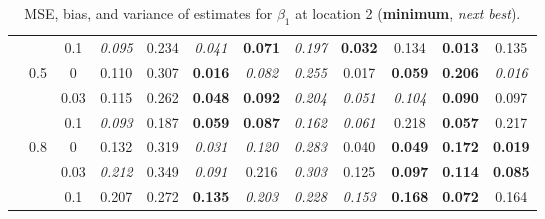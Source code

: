 \documentclass[authoryear, review, 11pt]{elsarticle}
\begin{document}
\begin{table}[ht]
\begin{center}
\begin{tabular}{ccc | ccc | ccc | ccc }
 &  & 0.1 &   \emph{0.095} & 0.234 & \emph{0.041} & \textbf{0.071} & \emph{0.197} & \textbf{0.032} & 0.134 & \textbf{0.013} & 0.135 \\ \cline{2-12}
 & \multirow{3}{*}{0.5} & 0 &   0.110 & 0.307 & \textbf{0.016} & \emph{0.082} & \emph{0.255} & 0.017 & \textbf{0.059} & \textbf{0.206} & \emph{0.016} \\ 
 &  & 0.03 &   0.115 & 0.262 & \textbf{0.048} & \textbf{0.092} & \emph{0.204} & \emph{0.051} & \emph{0.104} & \textbf{0.090} & 0.097 \\ 
 &  & 0.1 &   \emph{0.093} & 0.187 & \textbf{0.059} & \textbf{0.087} & \emph{0.162} & \emph{0.061} & 0.218 & \textbf{0.057} & 0.217 \\ \cline{2-12}
 & \multirow{3}{*}{0.8} & 0 &   0.132 & 0.319 & \emph{0.031} & \emph{0.120} & \emph{0.283} & 0.040 & \textbf{0.049} & \textbf{0.172} & \textbf{0.019} \\ 
 &  & 0.03 &   \emph{0.212} & 0.349 & \emph{0.091} & 0.216 & \emph{0.303} & 0.125 & \textbf{0.097} & \textbf{0.114} & \textbf{0.085} \\ 
 &  & 0.1 &   0.207 & 0.272 & \textbf{0.135} & \emph{0.203} & \emph{0.228} & \emph{0.153} & \textbf{0.168} & \textbf{0.072} & 0.164 \\ 
  \end{tabular}
\caption{MSE, bias, and variance of estimates for $\beta_1$ at location 2 (\textbf{minimum}, \emph{next best}).}
\end{center}
\end{table}
\end{document}
